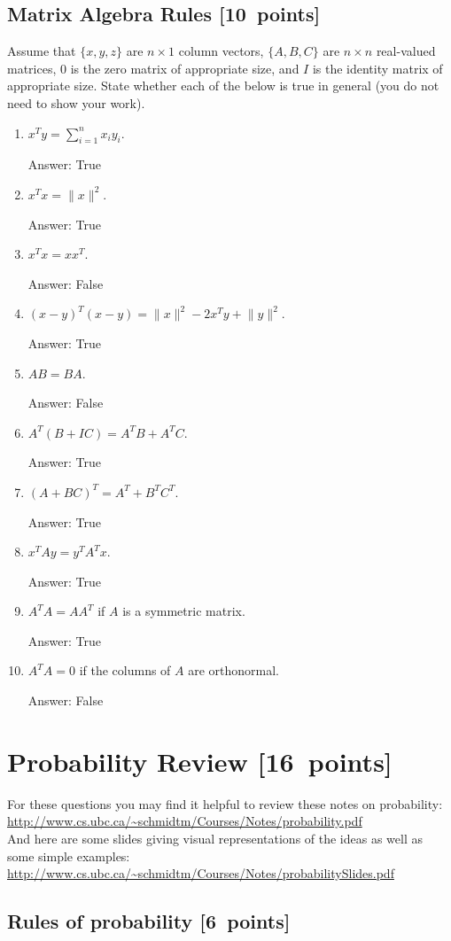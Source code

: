 \documentclass{article}
\newcommand{\blu}[1]{{\textcolor{blu}{#1}}}
\newcommand{\gre}[1]{\textcolor{gre}{#1}}
\newcommand\ans[1]{\par\gre{Answer: #1}}
\let\ask\blu
\newcommand\pts[1]{\textcolor{pointscolour}{[#1~points]}}
\newcommand{\norm}[1]{\lVert #1 \rVert}
\begin{document}
  \subsection{Matrix Algebra Rules \pts{10}}

  Assume that $\{x,y,z\}$ are $n \times 1$ column vectors, $\{A,B,C\}$ are $n \times n$ real-valued matrices, $0$ is the zero matrix of appropriate size, and $I$ is the identity matrix of appropriate size. \ask{State whether each of the below is true in general} (you do not need to show your work).

  \begin{enumerate}
  \item $x^Ty = \sum_{i=1}^n x_iy_i$.
  \ans{True}
  \item $x^Tx = \norm{x}^2$.
  \ans{True}
  \item $x^Tx = xx^T$.
  \ans{False}
  \item $(x-y)^T(x-y) = \norm{x}^2 - 2x^Ty + \norm{y}^2$.
  \ans{True}
  \item $AB=BA$.
  \ans{False}
  \item $A^T(B + IC) = A^TB + A^TC$.
  \ans{True}
  \item $(A + BC)^T = A^T + B^TC^T$.
  \ans{True}
  \item $x^TAy = y^TA^Tx$.
  \ans{True}
  \item $A^TA = AA^T$ if $A$ is a symmetric matrix.
  \ans{True}
  \item $A^TA = 0$ if the columns of $A$ are orthonormal.
  \ans{False}
  \end{enumerate}
  \newpage
  \clearpage\section{Probability Review \pts{16}}


  For these questions you may find it helpful to review these notes on probability:\\
  \url{http://www.cs.ubc.ca/~schmidtm/Courses/Notes/probability.pdf}\\
  And here are some slides giving visual representations of the ideas as well as some simple examples:\\
  \url{http://www.cs.ubc.ca/~schmidtm/Courses/Notes/probabilitySlides.pdf}

  \subsection{Rules of probability \pts{6}}
\end{document}
